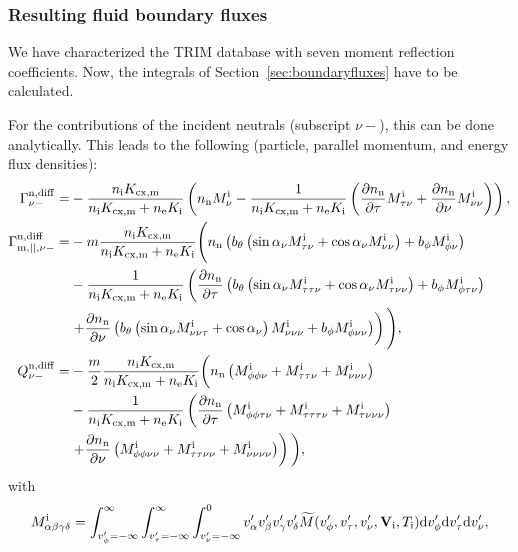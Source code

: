\subsubsection{Resulting fluid boundary fluxes}

We have characterized the TRIM database with seven moment reflection coefficients. Now, the integrals of Section~\ref{sec:boundaryfluxes} have to be calculated.

For the contributions of the incident neutrals (subscript $\nu-$), this can be done analytically. This leads to the following (particle, parallel momentum, and energy flux densities):
\begin{align}
\Gamma_{\nu-}^{\mathrm{n,diff}} =& - \frac{n_{\mathrm{i}}K_{\mathrm{cx,m}}}{n_{\mathrm{i}}K_{\mathrm{cx,m}} + n_{\mathrm{e}} K_{\mathrm{i}}} \left( n_{\mathrm{n}} M^\mathrm{i}_{\nu} - \frac{1}{n_{\mathrm{i}}K_{\mathrm{cx,m}} + n_{\mathrm{e}}K_{\mathrm{i}}} \left( \frac{\partial n_{\mathrm{n}}}{\partial \tau} M^\mathrm{i}_{\tau\nu} + \frac{\partial n_{\mathrm{n}}}{\partial \nu} M^\mathrm{i}_{\nu\nu} \right) \right), \label{eq:Gammanin2} \\
\Gamma_{\mathrm{m},||,\nu-}^{\mathrm{n,diff}} =& -m \frac{n_{\mathrm{i}}K_{\mathrm{cx,m}}}{n_{\mathrm{i}}K_{\mathrm{cx,m}} + n_{\mathrm{e}}K_{\mathrm{i}}} \Bigg( n_{\mathrm{n}} \left( b_{\theta} \left( \sin \alpha_{\nu} M^\mathrm{i}_{\tau\nu} + \cos \alpha_{\nu} M^\mathrm{i}_{\nu\nu} \right) + b_{\phi} M^\mathrm{i}_{\phi\nu} \right) \nonumber \\
&- \frac{1}{n_{\mathrm{i}}K_{\mathrm{cx,m}} + n_{\mathrm{e}}K_{\mathrm{i}}} \left( \frac{\partial n_{\mathrm{n}}}{\partial \tau} \left( b_{\theta} \left( \sin \alpha_{\nu} M^\mathrm{i}_{\tau\tau\nu} + \cos \alpha_{\nu} M^\mathrm{i}_{\tau\nu\nu} \right) + b_{\phi} M^\mathrm{i}_{\phi\tau\nu} \right) \right. \nonumber \\
& \left. + \frac{\partial n_{\mathrm{n}}}{\partial \nu} \left( b_{\theta} \left( \sin \alpha_{\nu} M^\mathrm{i}_{\nu\nu\tau} + \cos \alpha_{\nu} \right) M^\mathrm{i}_{\nu\nu\nu} + b_{\phi} M^\mathrm{i}_{\phi\nu\nu} \right) \right) \Bigg), \label{eq:Gammamompin} \\
Q_{\nu-}^{\mathrm{n,diff}} =& -\frac{m}{2} \frac{n_{\mathrm{i}}K_{\mathrm{cx,m}}}{n_{\mathrm{i}}K_{\mathrm{cx,m}} + n_{\mathrm{e}}K_{\mathrm{i}}} \bigg ( n_{\mathrm{n}} \left( M^\mathrm{i}_{\phi\phi\nu} + M^\mathrm{i}_{\tau\tau\nu} + M^\mathrm{i}_{\nu\nu\nu} \right) \nonumber \\
& - \frac{1}{n_{\mathrm{i}}K_{\mathrm{cx,m}} + n_{\mathrm{e}} K_{\mathrm{i}}} \left( \frac{\partial n_{\mathrm{n}}}{\partial \tau} \left( M^\mathrm{i}_{\phi\phi\tau\nu} + M^\mathrm{i}_{\tau\tau\tau\nu} + M^\mathrm{i}_{\tau\nu\nu\nu} \right) \right. \nonumber \\
&\left. + \frac{\partial n_{\mathrm{n}}}{\partial \nu} \left( M^\mathrm{i}_{\phi\phi\nu\nu} + M^\mathrm{i}_{\tau\tau\nu\nu} + M^\mathrm{i}_{\nu\nu\nu\nu} \right) \right ) \bigg ), \label{eq:Qnin}
\end{align}
with
\begin{equation}
M^\mathrm{i}_{\alpha\beta\gamma\delta} = \int_{v_{\phi}'=-\infty}^{\infty} \int_{v_{\tau}'=-\infty}^{\infty} \int_{v_{\nu}' = - \infty}^{0} v_{\alpha}' v_{\beta}' v_{\gamma}' v_{\delta}' \widetilde{M}(v_{\phi}',v_{\tau}',v_{\nu}',{\bf V}_{\mathrm{i}},T_{\mathrm{i}}) \mathrm{d} v_{\phi}' \mathrm{d} v_{\tau}' \mathrm{d} v_{\nu}',
\end{equation}

